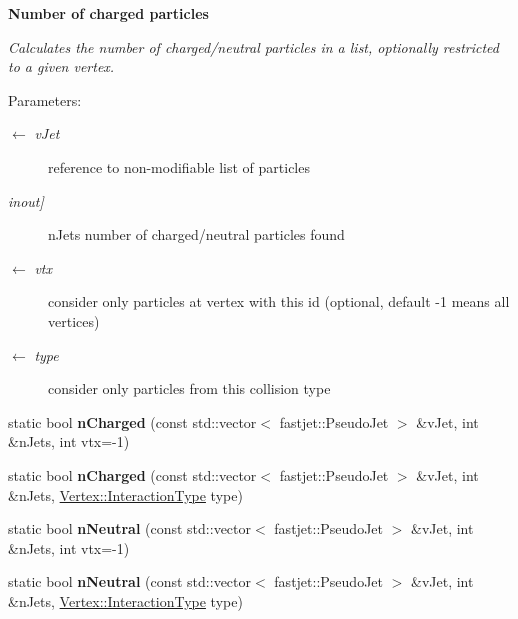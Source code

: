 \begin{Indent}{\bf Number of charged particles}\par
{\em Calculates the number of charged/neutral particles in a list, optionally restricted to a given vertex.

\begin{Desc}
\item[Parameters:]
\begin{description}
\item[\mbox{$\leftarrow$} {\em v\-Jet}]reference to non-modifiable list of particles \item[{\em inout\mbox{]}}]n\-Jets number of charged/neutral particles found \item[\mbox{$\leftarrow$} {\em vtx}]consider only particles at vertex with this id (optional, default -1 means all vertices) \item[\mbox{$\leftarrow$} {\em type}]consider only particles from this collision type \end{description}
\end{Desc}
}\begin{CompactItemize}
\item 
\hypertarget{structFeatures_7ef99add146e2c9afb51d2f2cddc4b5c}{
static bool \textbf{n\-Charged} (const std::vector$<$ fastjet::Pseudo\-Jet $>$ \&v\-Jet, int \&n\-Jets, int vtx=-1)}
\label{structFeatures_7ef99add146e2c9afb51d2f2cddc4b5c}

\item 
\hypertarget{structFeatures_1c818c2ca46ab74deb0448e4a9641702}{
static bool \textbf{n\-Charged} (const std::vector$<$ fastjet::Pseudo\-Jet $>$ \&v\-Jet, int \&n\-Jets, \hyperlink{classVertex_0d80a5c5ed3bd9be72a325aa448eca25}{Vertex::Interaction\-Type} type)}
\label{structFeatures_1c818c2ca46ab74deb0448e4a9641702}

\item 
\hypertarget{structFeatures_e5171fda475b20fd37f57cbfb346194f}{
static bool \textbf{n\-Neutral} (const std::vector$<$ fastjet::Pseudo\-Jet $>$ \&v\-Jet, int \&n\-Jets, int vtx=-1)}
\label{structFeatures_e5171fda475b20fd37f57cbfb346194f}

\item 
\hypertarget{structFeatures_4f381507457251208252ff15e2754be4}{
static bool \textbf{n\-Neutral} (const std::vector$<$ fastjet::Pseudo\-Jet $>$ \&v\-Jet, int \&n\-Jets, \hyperlink{classVertex_0d80a5c5ed3bd9be72a325aa448eca25}{Vertex::Interaction\-Type} type)}
\label{structFeatures_4f381507457251208252ff15e2754be4}

\end{CompactItemize}
\end{Indent}


